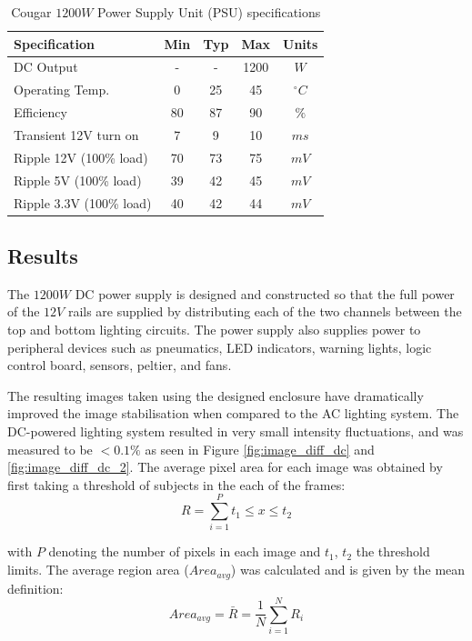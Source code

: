 \documentclass[fleqn,twoside]{article}
\begin{document}
\quad
\begin{table}[h]
	\centering
	\caption{Cougar $1200W$ Power Supply Unit (PSU) specifications}
	\label{tab:psu_spec}
	\begin{tabularx}{0.6\linewidth}{X*{4}{c}}	
		\toprule 
		Specification & Min & Typ & Max & Units\\ 
		\midrule
		DC Output & - & - & 1200 & $W$ \\[6pt]
		Operating Temp. & 0 & 25 & 45 & $^{\circ}C$ \\[6pt]
		Efficiency & 80 & 87 & 90 & $\%$ \\[6pt]
		Transient 12V turn on & 7 & 9 & 10 & $ms$ \\[6pt]	
		Ripple 12V (100\% load) & 70 & 73 & 75 & $mV$ \\[6pt]
		Ripple 5V (100\% load) & 39 & 42 & 45 & $mV$ \\[6pt]
		Ripple 3.3V (100\% load) & 40 & 42 & 44 & $mV$ \\[6pt]
		
		\bottomrule
	\end{tabularx}
\end{table}

\subsection{Results}

The $1200W$ DC power supply is designed and constructed so that the full power of the $12V$ rails are supplied by distributing each of the two channels between the top and bottom lighting circuits. The power supply also supplies power to peripheral devices such as pneumatics, LED indicators, warning lights, logic control board, sensors, peltier, and fans.

The resulting images taken using the designed enclosure have dramatically improved the image stabilisation when compared to the AC lighting system. The DC-powered lighting system resulted in very small intensity fluctuations, and was measured to be $<0.1\%$ as seen in Figure \ref{fig:image_diff_dc} and \ref{fig:image_diff_dc_2}. The average pixel area for each image was obtained by first taking a threshold of subjects in the each of the frames:
\begin{equation}
R = \sum_{i=1}^{P}t_1 \leq x \leq t_2
\end{equation}

with $P$ denoting the number of pixels in each image and $t_1$, $t_2$ the threshold limits. The average region area ($Area_{avg}$) was calculated and is given by the mean definition:
\begin{equation}
Area_{avg} = \bar{R} = \frac{1}{N}\sum_{i=1}^{N}R_i
\end{equation}
\end{document}
